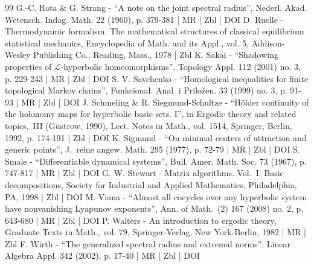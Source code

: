 \begin{thebibliography}{99}
G.-C. Rota \& G. Strang - “A note on the joint spectral radius”, Nederl. Akad. Wetensch. Indag. Math. 22 (1960), p. 379-381 | MR | Zbl | DOI
D. Ruelle - Thermodynamic formalism. The mathematical structures of classical equilibrium statistical mechanics, Encyclopedia of Math. and its Appl., vol. 5, Addison-Wesley Publishing Co., Reading, Mass., 1978 | Zbl
K. Sakai - “Shadowing properties of $\mathcal{L}$-hyperbolic homeomorphisms”, Topology Appl. 112 (2001) no. 3, p. 229-243 | MR | Zbl | DOI
S. V. Savchenko - “Homological inequalities for finite topological Markov chains”, Funkcional. Anal. i Priložen. 33 (1999) no. 3, p. 91-93 | MR | Zbl | DOI
J. Schmeling \& R. Siegmund-Schultze - “Hölder continuity of the holonomy maps for hyperbolic basic sets. I”, in Ergodic theory and related topics, III (Güstrow, 1990), Lect. Notes in Math., vol. 1514, Springer, Berlin, 1992, p. 174-191 | Zbl | DOI
K. Sigmund - “On minimal centers of attraction and generic points”, J. reine angew. Math. 295 (1977), p. 72-79 | MR | Zbl | DOI
S. Smale - “Differentiable dynamical systems”, Bull. Amer. Math. Soc. 73 (1967), p. 747-817 | MR | Zbl | DOI
G. W. Stewart - Matrix algorithms. Vol. I. Basic decompositions, Society for Industrial and Applied Mathematics, Philadelphia, PA, 1998 | Zbl | DOI
M. Viana - “Almost all cocycles over any hyperbolic system have nonvanishing Lyapunov exponents”, Ann. of Math. (2) 167 (2008) no. 2, p. 643-680 | MR | Zbl | DOI
P. Walters - An introduction to ergodic theory, Graduate Texts in Math., vol. 79, Springer-Verlag, New York-Berlin, 1982 | MR | Zbl
F. Wirth - “The generalized spectral radius and extremal norms”, Linear Algebra Appl. 342 (2002), p. 17-40 | MR | Zbl | DOI
\end{thebibliography}
